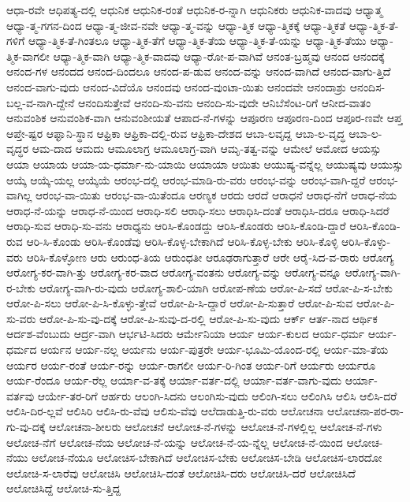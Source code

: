 {ಆಧಾ-ರವೇ
ಆಧಿಪತ್ಯ-ದಲ್ಲಿ
ಆಧುನಿಕ
ಆಧುನಿಕ-ರಂತೆ
ಆಧುನಿಕ-ರ-ನ್ನಾಗಿ
ಆಧುನಿಕರು
ಆಧುನಿಕ-ವಾದವು
ಆಧ್ಯಾತ್ಮ
ಆಧ್ಯಾ-ತ್ಮ-ಗಗನ-ದಿಂದ
ಆಧ್ಯಾ-ತ್ಮ-ಜೀವ-ನವೇ
ಆಧ್ಯಾ-ತ್ಮ-ವನ್ನು
ಆಧ್ಯಾ-ತ್ಮಿಕ
ಆಧ್ಯಾ-ತ್ಮಿಕಕ್ಕೆ
ಆಧ್ಯಾ-ತ್ಮಿಕತೆ
ಆಧ್ಯಾ-ತ್ಮಿಕ-ತೆ-ಗಳಿಗೆ
ಆಧ್ಯಾ-ತ್ಮಿಕ-ತೆ-ಗಿಂತಲೂ
ಆಧ್ಯಾ-ತ್ಮಿಕ-ತೆಗೆ
ಆಧ್ಯಾ-ತ್ಮಿಕ-ತೆಯ
ಆಧ್ಯಾ-ತ್ಮಿಕ-ತೆ-ಯನ್ನು
ಆಧ್ಯಾ-ತ್ಮಿಕ-ತೆಯು
ಆಧ್ಯಾ-ತ್ಮಿಕ-ವಾಗಲೀ
ಆಧ್ಯಾ-ತ್ಮಿಕ-ವಾಗಿ
ಆಧ್ಯಾ-ತ್ಮಿಕ-ವಾದವು
ಆಧ್ಯಾ-ರೋ-ಪ-ವಾಗಿವೆ
ಆನಂತ-ಬ್ರಹ್ಮವು
ಆನಂದ
ಆನಂದಕ್ಕೆ
ಆನಂದ-ಗಳ
ಆನಂದದ
ಆನಂದ-ದಿಂದಲೂ
ಆನಂದ-ಪ-ಡುವ
ಆನಂದ-ವನ್ನು
ಆನಂದ-ವಾಗಿದೆ
ಆನಂದ-ವಾಗು-ತ್ತಿದೆ
ಆನಂದ-ವಾಗು-ವುದು
ಆನಂದ-ವಿದೆಯೊ
ಆನಂದವು
ಆನಂದ-ವುಂಟಾ-ಯಿತು
ಆನಂದವೇ
ಆನಂದಾಶ್ರು
ಆನಂದಿಸ-ಬಲ್ಲ-ವ-ನಾಗಿ-ದ್ದೇನೆ
ಆನಂದಿಸುತ್ತೇವೆ
ಆನಂದಿ-ಸು-ವನು
ಆನಂದಿ-ಸು-ವುದೇ
ಆನಿಬೆಸೆಂಟ-ರಿಗೆ
ಆನೀದ-ವಾತಂ
ಆನುವಂಶಿಕ
ಆನುವಂಶಿಕ-ವಾಗಿ
ಆನುವಂಶೀಯತೆ
ಆಪಾದ-ನೆ-ಗಳನ್ನು
ಆಪೂರಣ
ಆಪೂರಣ-ದಿಂದ
ಆಪೂರ-ಣವೇ
ಆಪ್ತ
ಆಪ್ತೇ-ಷ್ಟರ
ಆಫ್ಘಾನಿ-ಸ್ಥಾನ
ಆಫ್ರಿಕಾ
ಆಫ್ರಿಕಾ-ದಲ್ಲಿ-ರುವ
ಆಫ್ರಿಕಾ-ದೇಶದ
ಆಬಾ-ಲವೃದ್ದ
ಆಬಾ-ಲ-ವೃದ್ಧ
ಆಬಾ-ಲ-ವೃದ್ಧರ
ಆಮ-ದಾದ
ಆಮದು
ಆಮೂಲಾಗ್ರ
ಆಮೂಲಾಗ್ರ-ವಾಗಿ
ಆಮೃ-ತತ್ವ-ವನ್ನು
ಆಮೇಲೆ
ಆಮೋದ
ಆಯಸ್ಸು
ಆಯಾ
ಆಯಾಯ
ಆಯಾ-ಯ-ಧರ್ಮಾ-ನು-ಯಾಯಿ
ಆಯಾಯಾ
ಆಯಿತು
ಆಯುಷ್ಯ-ವನ್ನೆಲ್ಲ
ಆಯುಷ್ಯವು
ಆಯುಸ್ಸು
ಆಯ್ಕೆ
ಆಯ್ಕೆ-ಯಲ್ಲ
ಆಯ್ಕೆಯೆ
ಆರಂಭ-ದಲ್ಲಿ
ಆರಂಭ-ಮಾಡಿ-ರು-ವರು
ಆರಂಭ-ವನ್ನು
ಆರಂಭ-ವಾಗಿ-ದ್ದರೆ
ಆರಂಭ-ವಾಗಿಲ್ಲ
ಆರಂಭ-ವಾ-ಯಿತು
ಆರಂಭ-ವಾ-ಯಿತೆಂದೂ
ಆರಣ್ಯಕ
ಆರದು
ಆರದೆ
ಆರಾಧನೆ
ಆರಾಧ-ನೆಗೆ
ಆರಾಧ-ನೆಯ
ಆರಾಧ-ನೆ-ಯನ್ನು
ಆರಾಧ-ನೆ-ಯಿಂದ
ಆರಾಧಿ-ಸಲಿ
ಆರಾಧಿ-ಸಲು
ಆರಾಧಿಸಿ-ದಂತೆ
ಆರಾಧಿಸಿ-ದರೂ
ಆರಾಧಿ-ಸಿದರೆ
ಆರಾಧಿ-ಸುವ
ಆರಾಧಿ-ಸು-ವನು
ಆರಾಧ್ಯನು
ಆರಿಸಿ-ಕೊಂಡದ್ದು
ಆರಿಸಿ-ಕೊಂಡರು
ಆರಿಸಿ-ಕೊಂಡಿ-ದ್ದಾರೆ
ಆರಿಸಿ-ಕೊಂಡಿ-ರುವ
ಆರಿ-ಸಿ-ಕೊಂಡು
ಆರಿಸಿ-ಕೊಂಡೆವು
ಆರಿಸಿ-ಕೊಳ್ಳ-ಬೇಕಾಗಿದೆ
ಆರಿಸಿ-ಕೊಳ್ಳ-ಬೇಕು
ಆರಿಸಿ-ಕೊಳ್ಳಿ
ಆರಿಸಿ-ಕೊಳ್ಳು-ವರು
ಆರಿಸಿ-ಕೊಳ್ಳೋಣ
ಆರು
ಆರುಂಧ-ತಿಯ
ಆರುಂಧತೀ
ಆರೂಢರಾಗುತ್ತಾರೆ
ಆರೇ
ಆರೈ-ಸಿದ-ವ-ರಾರು
ಆರೋಗ್ಯ
ಆರೋಗ್ಯ-ಕರ-ವಾಗಿ-ತ್ತು
ಆರೋಗ್ಯ-ಕರ-ವಾದ
ಆರೋಗ್ಯ-ವಂತನು
ಆರೋಗ್ಯ-ವನ್ನು
ಆರೋಗ್ಯ-ವನ್ನೂ
ಆರೋಗ್ಯ-ವಾಗಿ-ರ-ಬೇಕು
ಆರೋಗ್ಯ-ವಾಗಿ-ರು-ವುದು
ಆರೋಗ್ಯ-ಶಾಲಿ-ಯಾಗಿ
ಆರೋಪ-ಣೆಯ
ಆರೋ-ಪಿ-ಸದೆ
ಆರೋ-ಪಿ-ಸ-ಬೇಕು
ಆರೋ-ಪಿ-ಸಲು
ಆರೋ-ಪಿ-ಸಿ-ಕೊಳ್ಳು-ತ್ತೇವೆ
ಆರೋ-ಪಿ-ಸಿ-ದ್ದಾರೆ
ಆರೋ-ಪಿ-ಸುತ್ತಾರೆ
ಆರೋ-ಪಿ-ಸುವ
ಆರೋ-ಪಿ-ಸು-ವರು
ಆರೋ-ಪಿ-ಸು-ವು-ದಕ್ಕೆ
ಆರೋ-ಪಿ-ಸುವು-ದ-ರಲ್ಲಿ
ಆರೋ-ಪಿ-ಸು-ವುದು
ಆರ್ಕ್
ಆರ್ತ-ನಾದ
ಆರ್ಥಿಕ
ಆರ್ದಶ-ವೆಂಬುದು
ಆರ್ದ್ರ-ವಾಗಿ
ಆರ್ಭಟಿ-ಸಿದರು
ಆರ್ಮೇನಿಯಾ
ಆರ್ಯ
ಆರ್ಯ-ಕುಲದ
ಆರ್ಯ-ಧರ್ಮ
ಆರ್ಯ-ಧರ್ಮದ
ಆರ್ಯನ
ಆರ್ಯ-ನಲ್ಲ
ಆರ್ಯನು
ಆರ್ಯ-ಪುತ್ರರೇ
ಆರ್ಯ-ಭೂಮಿ-ಯೊಂದ-ರಲ್ಲಿ
ಆರ್ಯ-ಮಾ-ತೆಯ
ಆರ್ಯರ
ಆರ್ಯ-ರಂತೆ
ಆರ್ಯ-ರನ್ನು
ಆರ್ಯ-ರಾಗಲೀ
ಆರ್ಯ-ರಿ-ಗಿಂತ
ಆರ್ಯ-ರಿಗೆ
ಆರ್ಯರು
ಆರ್ಯರೂ
ಆರ್ಯ-ರೆಂದೂ
ಆರ್ಯ-ರೆಲ್ಲ
ಆರ್ಯಾ-ವ-ತಕ್ಕೆ
ಆರ್ಯಾ-ವರ್ತ-ದಲ್ಲಿ
ಆರ್ಯಾ-ವರ್ತ-ವಾಗು-ವುದು
ಆರ್ಯಾ-ವರ್ತವು
ಆರ್ಯೇ-ತರ-ರಿಗೆ
ಆರ್ಹರು
ಆಲಂಗಿ-ಸಿದನು
ಆಲಂಗಿಸು-ವುದು
ಆಲಿಂಗಿ-ಸಲು
ಆಲಿಂಗಿಸಿ
ಆಲಿಸಿ
ಆಲಿಸಿ-ದರೆ
ಆಲಿಸಿ-ದಿರ-ಲ್ಲವೆ
ಆಲಿಸಿರಿ
ಆಲಿಸಿ-ರು-ವೆವು
ಆಲಿಸು-ವೆವು
ಆಲೆದಾಡುತ್ತಿ-ರು-ವರು
ಆಲೋಚನಾ
ಆಲೋಚನಾ-ಪರ-ರಾ-ಗು-ವು-ದಕ್ಕೆ
ಆಲೋಚನಾ-ಶೀಲರು
ಆಲೋಚನೆ
ಆಲೋಚ-ನೆ-ಗಳನ್ನು
ಆಲೋಚ-ನೆ-ಗಳಲ್ಲಿಲ್ಲ
ಆಲೋಚ-ನೆ-ಗಳು
ಆಲೋಚ-ನೆಗೆ
ಆಲೋಚ-ನೆಯ
ಆಲೋಚ-ನೆ-ಯನ್ನು
ಆಲೋಚ-ನೆ-ಯ-ನ್ನೆಲ್ಲ
ಆಲೋಚ-ನೆ-ಯಿಂದ
ಆಲೋಚ-ನೆಯು
ಆಲೋಚ-ನೆಯೂ
ಆಲೋಚಿಸ-ಬೇಕಾಗಿದೆ
ಆಲೋಚಿಸ-ಬೇಕು
ಆಲೋಚಿಸ-ಬೇಡಿ
ಆಲೋಚಿಸ-ಲಾರದೋ
ಆಲೋಚಿ-ಸ-ಲಾರೆವು
ಆಲೋಚಿಸಿ
ಆಲೋಚಿಸಿ-ದಂತೆ
ಆಲೋಚಿಸಿ-ದರು
ಆಲೋಚಿಸಿ-ದರೆ
ಆಲೋಚಿಸಿದೆ
ಆಲೋಚಿಸಿದ್ದೆ
ಆಲೋಚಿ-ಸು-ತ್ತಿದ್ದ
}
